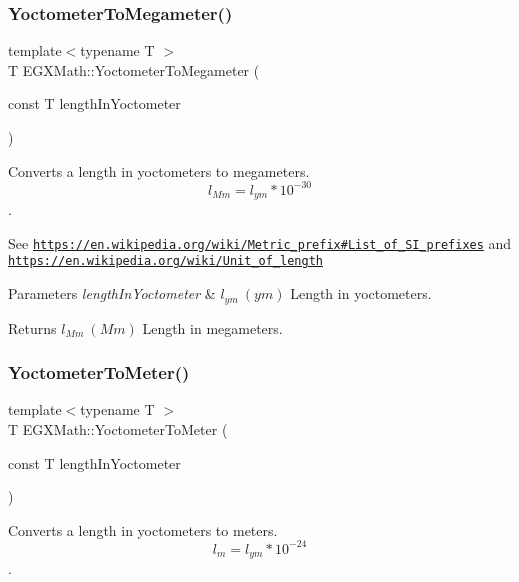 \subsubsection{\texorpdfstring{Yoctometer\+To\+Megameter()}{YoctometerToMegameter()}}
{\footnotesize\ttfamily template$<$typename T $>$ \\
T E\+G\+X\+Math\+::\+Yoctometer\+To\+Megameter (\begin{DoxyParamCaption}\item[{const T}]{length\+In\+Yoctometer }\end{DoxyParamCaption})}



Converts a length in yoctometers to megameters. \[ l_{Mm}=l_{ym} * 10^{-30} \]. 

See \href{https://en.wikipedia.org/wiki/Metric_prefix#List_of_SI_prefixes}{\tt https\+://en.\+wikipedia.\+org/wiki/\+Metric\+\_\+prefix\#\+List\+\_\+of\+\_\+\+S\+I\+\_\+prefixes} and \href{https://en.wikipedia.org/wiki/Unit_of_length}{\tt https\+://en.\+wikipedia.\+org/wiki/\+Unit\+\_\+of\+\_\+length} 
\begin{DoxyParams}{Parameters}
{\em length\+In\+Yoctometer} & $ l_{ym}\ (ym)$ Length in yoctometers. \\
\hline
\end{DoxyParams}
\begin{DoxyReturn}{Returns}
$ l_{Mm}\ (Mm)$ Length in megameters. 
\end{DoxyReturn}
\mbox{\label{group___e_g_x_math-_conversions-_length_conversions-_s_i-_yoctometer-_s_i_ga35b89591930f45660f7dcdae8660b554}} 
\subsubsection{\texorpdfstring{Yoctometer\+To\+Meter()}{YoctometerToMeter()}}
{\footnotesize\ttfamily template$<$typename T $>$ \\
T E\+G\+X\+Math\+::\+Yoctometer\+To\+Meter (\begin{DoxyParamCaption}\item[{const T}]{length\+In\+Yoctometer }\end{DoxyParamCaption})}



Converts a length in yoctometers to meters. \[ l_{m}=l_{ym} * 10^{-24} \]. 


